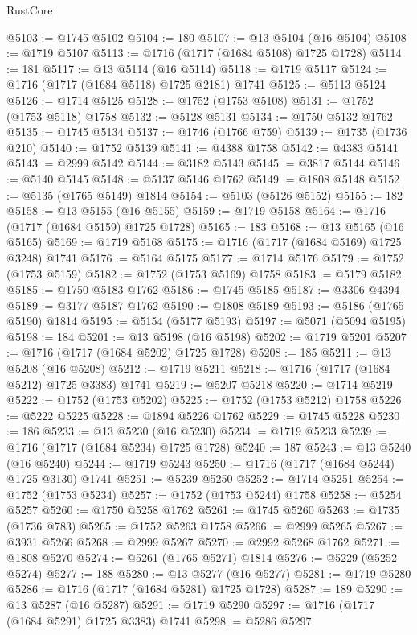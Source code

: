 \begin{lexlean}{RustCore}
\begin{coremodule}
@5103 := @1745 @5102
@5104 := 180
@5107 := @13 @5104 (@16 @5104)
@5108 := @1719 @5107
@5113 := @1716 (@1717 (@1684 @5108) @1725 @1728)
@5114 := 181
@5117 := @13 @5114 (@16 @5114)
@5118 := @1719 @5117
@5124 := @1716 (@1717 (@1684 @5118) @1725 @2181) @1741
@5125 := @5113 @5124
@5126 := @1714 @5125
@5128 := @1752 (@1753 @5108)
@5131 := @1752 (@1753 @5118) @1758
@5132 := @5128 @5131
@5134 := @1750 @5132 @1762
@5135 := @1745 @5134
@5137 := @1746 (@1766 @759)
@5139 := @1735 (@1736 @210)
@5140 := @1752 @5139
@5141 := @4388 @1758
@5142 := @4383 @5141
@5143 := @2999 @5142
@5144 := @3182 @5143
@5145 := @3817 @5144
@5146 := @5140 @5145
@5148 := @5137 @5146 @1762
@5149 := @1808 @5148
@5152 := @5135 (@1765 @5149) @1814
@5154 := @5103 (@5126 @5152)
@5155 := 182
@5158 := @13 @5155 (@16 @5155)
@5159 := @1719 @5158
@5164 := @1716 (@1717 (@1684 @5159) @1725 @1728)
@5165 := 183
@5168 := @13 @5165 (@16 @5165)
@5169 := @1719 @5168
@5175 := @1716 (@1717 (@1684 @5169) @1725 @3248) @1741
@5176 := @5164 @5175
@5177 := @1714 @5176
@5179 := @1752 (@1753 @5159)
@5182 := @1752 (@1753 @5169) @1758
@5183 := @5179 @5182
@5185 := @1750 @5183 @1762
@5186 := @1745 @5185
@5187 := @3306 @4394
@5189 := @3177 @5187 @1762
@5190 := @1808 @5189
@5193 := @5186 (@1765 @5190) @1814
@5195 := @5154 (@5177 @5193)
@5197 := @5071 (@5094 @5195)
@5198 := 184
@5201 := @13 @5198 (@16 @5198)
@5202 := @1719 @5201
@5207 := @1716 (@1717 (@1684 @5202) @1725 @1728)
@5208 := 185
@5211 := @13 @5208 (@16 @5208)
@5212 := @1719 @5211
@5218 := @1716 (@1717 (@1684 @5212) @1725 @3383) @1741
@5219 := @5207 @5218
@5220 := @1714 @5219
@5222 := @1752 (@1753 @5202)
@5225 := @1752 (@1753 @5212) @1758
@5226 := @5222 @5225
@5228 := @1894 @5226 @1762
@5229 := @1745 @5228
@5230 := 186
@5233 := @13 @5230 (@16 @5230)
@5234 := @1719 @5233
@5239 := @1716 (@1717 (@1684 @5234) @1725 @1728)
@5240 := 187
@5243 := @13 @5240 (@16 @5240)
@5244 := @1719 @5243
@5250 := @1716 (@1717 (@1684 @5244) @1725 @3130) @1741
@5251 := @5239 @5250
@5252 := @1714 @5251
@5254 := @1752 (@1753 @5234)
@5257 := @1752 (@1753 @5244) @1758
@5258 := @5254 @5257
@5260 := @1750 @5258 @1762
@5261 := @1745 @5260
@5263 := @1735 (@1736 @783)
@5265 := @1752 @5263 @1758
@5266 := @2999 @5265
@5267 := @3931 @5266
@5268 := @2999 @5267
@5270 := @2992 @5268 @1762
@5271 := @1808 @5270
@5274 := @5261 (@1765 @5271) @1814
@5276 := @5229 (@5252 @5274)
@5277 := 188
@5280 := @13 @5277 (@16 @5277)
@5281 := @1719 @5280
@5286 := @1716 (@1717 (@1684 @5281) @1725 @1728)
@5287 := 189
@5290 := @13 @5287 (@16 @5287)
@5291 := @1719 @5290
@5297 := @1716 (@1717 (@1684 @5291) @1725 @3383) @1741
@5298 := @5286 @5297

\end{coremodule}
\end{lexlean}
